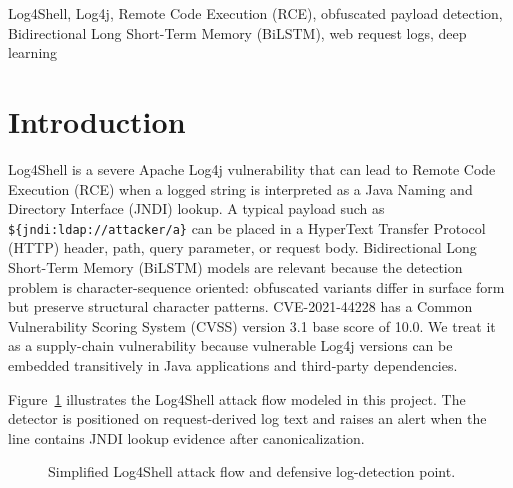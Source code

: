 \documentclass[conference]{IEEEtran}
\begin{document}
\begin{IEEEkeywords}
Log4Shell, Log4j, Remote Code Execution (RCE), obfuscated payload detection,
Bidirectional Long Short-Term Memory (BiLSTM), web request logs, deep learning
\end{IEEEkeywords}

\section{Introduction}

Log4Shell is a severe Apache Log4j vulnerability that can lead to Remote Code
Execution (RCE) when a logged string is interpreted as a Java Naming and
Directory Interface (JNDI) lookup. A typical payload such as
\texttt{\$\{jndi:ldap://attacker/a\}} can be placed in a HyperText Transfer
Protocol (HTTP) header, path, query parameter, or request body. Bidirectional
Long Short-Term Memory (BiLSTM) models are relevant because the detection
problem is character-sequence oriented: obfuscated variants differ in surface
form but preserve structural character patterns.
CVE-2021-44228 has a Common Vulnerability Scoring System (CVSS) version 3.1
base score of 10.0. We treat it as a supply-chain vulnerability because
vulnerable Log4j versions can be embedded transitively in Java applications
and third-party dependencies.

Figure~\ref{fig:attack_flow} illustrates the Log4Shell attack flow modeled in
this project. The detector is positioned on request-derived log text and
raises an alert when the line contains JNDI lookup evidence after
canonicalization.

\begin{figure}[!t]
\centering
{}
\caption{Simplified Log4Shell attack flow and defensive log-detection point.}
\label{fig:attack_flow}
\end{figure}
\end{document}
